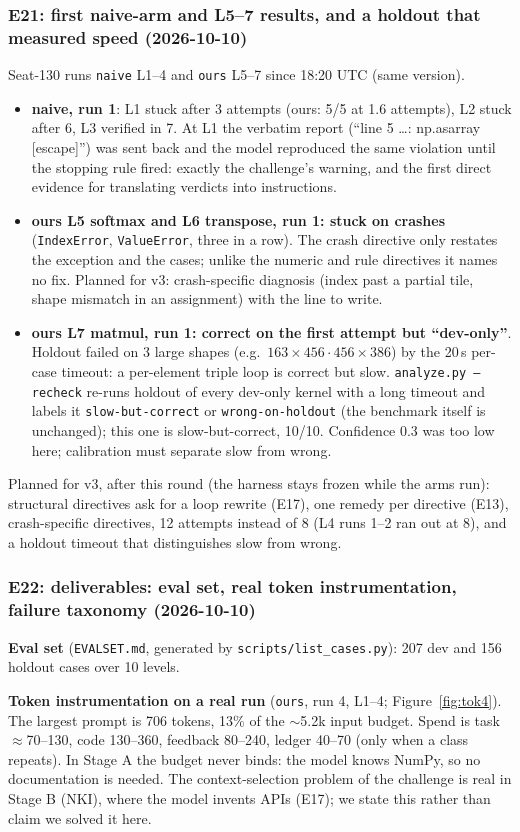 \documentclass[11pt]{article}
\newcommand{\code}[1]{\texttt{#1}}
\newcommand{\entry}[2]{\subsubsection*{#1 \textnormal{\small(#2)}}}
\begin{document}
\entry{E21: first naive-arm and L5--7 results, and a holdout that measured speed}{2026-10-10}
Seat-130 runs \code{naive} L1--4 and \code{ours} L5--7 since 18:20 UTC (same version).
\begin{itemize}
  \item \textbf{naive, run 1}: L1 stuck after 3 attempts (ours: 5/5 at 1.6 attempts), L2 stuck after 6,
        L3 verified in 7. At L1 the verbatim report (``line 5 \dots: np.asarray [escape]'') was sent
        back and the model reproduced the same violation until the stopping rule fired: exactly the
        challenge's warning, and the first direct evidence for translating verdicts into instructions.
  \item \textbf{ours L5 softmax and L6 transpose, run 1: stuck on crashes} (\code{IndexError},
        \code{ValueError}, three in a row). The crash directive only restates the exception and the
        cases; unlike the numeric and rule directives it names no fix. Planned for v3: crash-specific
        diagnosis (index past a partial tile, shape mismatch in an assignment) with the line to write.
  \item \textbf{ours L7 matmul, run 1: correct on the first attempt but ``dev-only''}. Holdout failed on
        3 large shapes (e.g.\ $163{\times}456 \cdot 456{\times}386$) by the 20\,s per-case timeout: a
        per-element triple loop is correct but slow. \code{analyze.py --recheck} re-runs holdout of every
        dev-only kernel with a long timeout and labels it \code{slow-but-correct} or \code{wrong-on-holdout}
        (the benchmark itself is unchanged); this one is slow-but-correct, 10/10. Confidence 0.3 was too
        low here; calibration must separate slow from wrong.
\end{itemize}
Planned for v3, after this round (the harness stays frozen while the arms run): structural directives
ask for a loop rewrite (E17), one remedy per directive (E13), crash-specific directives, 12 attempts
instead of 8 (L4 runs 1--2 ran out at 8), and a holdout timeout that distinguishes slow from wrong.

\entry{E22: deliverables: eval set, real token instrumentation, failure taxonomy}{2026-10-10}
\textbf{Eval set} (\code{EVALSET.md}, generated by \code{scripts/list\_cases.py}): 207 dev and 156 holdout
cases over 10 levels.



\medskip
\textbf{Token instrumentation on a real run} (\code{ours}, run 4, L1--4; Figure~\ref{fig:tok4}). The
largest prompt is 706 tokens, 13\% of the $\sim$5.2k input budget. Spend is task $\approx$70--130,
code 130--360, feedback 80--240, ledger 40--70 (only when a class repeats). In Stage A the budget never
binds: the model knows NumPy, so no documentation is needed. The context-selection problem of the
challenge is real in Stage B (NKI), where the model invents APIs (E17); we state this rather than
claim we solved it here.
\end{document}
